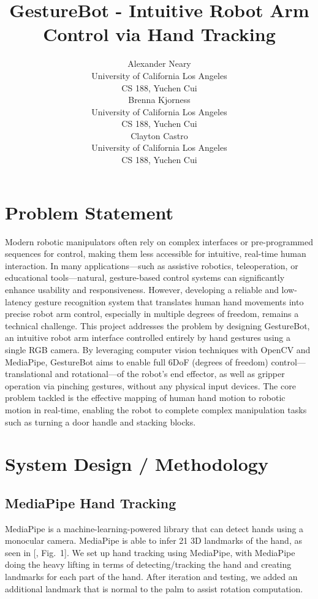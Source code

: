 \documentclass{article}
\title{GestureBot - Intuitive Robot Arm Control via Hand Tracking}
\author{
  Alexander Neary\\
  University of California Los Angeles \\
  CS 188, Yuchen Cui\\
  \And
  Brenna Kjorness\\
   University of California Los Angeles \\
  CS 188, Yuchen Cui\\
  \And
    Clayton Castro\\
     University of California Los Angeles \\
  CS 188, Yuchen Cui\\
}
\begin{document}
\maketitle




\section{Problem Statement}

Modern robotic manipulators often rely on complex interfaces or pre-programmed
sequences for control, making them less accessible for intuitive, real-time
human interaction. In many applications—such as assistive robotics,
teleoperation, or educational tools—natural, gesture-based control systems can
significantly enhance usability and responsiveness. However, developing a
reliable and low-latency gesture recognition system that translates human hand
movements into precise robot arm control, especially in multiple degrees of
freedom, remains a technical challenge. This project addresses the problem by
designing GestureBot, an intuitive robot arm interface controlled entirely
by hand gestures using a single RGB camera. By leveraging computer vision
techniques with OpenCV and MediaPipe, GestureBot aims to enable full 6DoF
(degrees of freedom) control—translational and rotational—of the robot’s end
effector, as well as gripper operation via pinching gestures, without any
physical input devices. The core problem tackled is the effective mapping of
human hand motion to robotic motion in real-time, enabling the robot to
complete complex manipulation tasks such as turning a door handle and stacking
blocks.


\section{System Design / Methodology}
\label{sec:citations}



\subsection{MediaPipe Hand Tracking}
MediaPipe is a machine-learning-powered library that can detect hands using a
monocular camera. MediaPipe is able to infer 21 3D landmarks of the hand, as
seen in [\citealp{MediaPipeHands}, Fig.~1]. We set up hand tracking using
MediaPipe\cite{MediaPipeGuide}, with MediaPipe doing the heavy lifting in terms
of detecting/tracking the hand and creating landmarks for each part of the
hand. After iteration and testing, we added an additional landmark that is
normal to the palm to assist rotation computation. 
\end{document}
